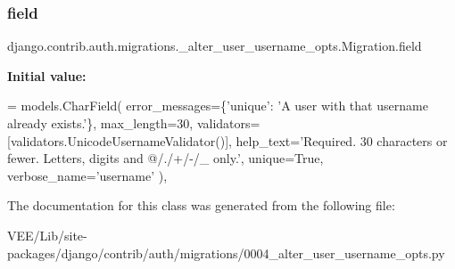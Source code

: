 \subsubsection{\texorpdfstring{field}{field}}
{\footnotesize\ttfamily django.\+contrib.\+auth.\+migrations.\+\_\+alter\+\_\+user\+\_\+username\+\_\+opts.\+Migration.\+field\hspace{0.3cm}{\ttfamily [static]}}

{\bfseries Initial value\+:}
\begin{DoxyCode}
= models.CharField(
                error\_messages=\{\textcolor{stringliteral}{'unique'}: \textcolor{stringliteral}{'A user with that username already exists.'}\}, max\_length=30,
                validators=[validators.UnicodeUsernameValidator()],
                help\_text=\textcolor{stringliteral}{'Required. 30 characters or fewer. Letters, digits and @/./+/-/\_ only.'},
                unique=\textcolor{keyword}{True}, verbose\_name=\textcolor{stringliteral}{'username'}
            ),
\end{DoxyCode}


The documentation for this class was generated from the following file\+:\begin{DoxyCompactItemize}
\item 
V\+E\+E/\+Lib/site-\/packages/django/contrib/auth/migrations/0004\+\_\+alter\+\_\+user\+\_\+username\+\_\+opts.\+py\end{DoxyCompactItemize}
